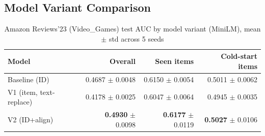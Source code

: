 \subsection{Model Variant Comparison}
\label{sec:results-amazon-main}

\begin{table}[h]
\centering
\caption{Amazon Reviews'23 (Video\_Games) test AUC by model variant (MiniLM), mean $\pm$ std across 5 seeds}
\label{tab:amazon-main}
\begin{tabular}{lrrr}
\toprule
Model & Overall\footnotemark & Seen items & Cold-start items \\
\midrule
Baseline (ID)                & 0.4687 $\pm$ 0.0048 & 0.6150 $\pm$ 0.0054 & 0.5011 $\pm$ 0.0062 \\
V1 (item, text-replace)      & 0.4178 $\pm$ 0.0025 & 0.6047 $\pm$ 0.0064 & 0.4945 $\pm$ 0.0035 \\
V2 (ID+align)                & \textbf{0.4930} $\pm$ 0.0098 & \textbf{0.6177} $\pm$ 0.0119 & \textbf{0.5027} $\pm$ 0.0106 \\
\bottomrule
\end{tabular}
\end{table}


